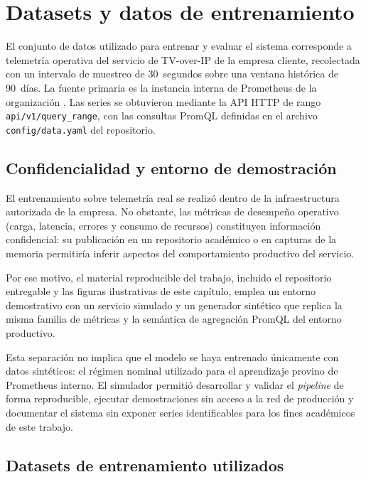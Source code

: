 \section{Datasets y datos de entrenamiento}
\label{sec:datasets}

El conjunto de datos utilizado para entrenar y evaluar el sistema corresponde a telemetría operativa del servicio de TV-over-IP de la empresa cliente, recolectada con un intervalo de muestreo de 30~segundos sobre una ventana histórica de 90~días. La fuente primaria es la instancia interna de Prometheus de la organización \citep{brazil2018prometheus, prometheus_site}. Las series se obtuvieron mediante la API HTTP de rango \texttt{api/v1/query\_range}, con las consultas PromQL definidas en el archivo \texttt{config/data.yaml} del repositorio.

\subsection{Confidencialidad y entorno de demostración}

El entrenamiento sobre telemetría real se realizó dentro de la infraestructura autorizada de la empresa. No obstante, las métricas de desempeño operativo (carga, latencia, errores y consumo de recursos) constituyen información confidencial: su publicación en un repositorio académico o en capturas de la memoria permitiría inferir aspectos del comportamiento productivo del servicio.

Por ese motivo, el material reproducible del trabajo, incluido el repositorio entregable y las figuras ilustrativas de este capítulo, emplea un entorno demostrativo con un servicio simulado y un generador sintético que replica la misma familia de métricas y la semántica de agregación PromQL del entorno productivo.

Esta separación no implica que el modelo se haya entrenado únicamente con datos sintéticos: el régimen nominal utilizado para el aprendizaje provino de Prometheus interno. El simulador permitió desarrollar y validar el \textit{pipeline} de forma reproducible, ejecutar demostraciones sin acceso a la red de producción y documentar el sistema sin exponer series identificables para los fines académicos de este trabajo.

\subsection{Datasets de entrenamiento utilizados}

